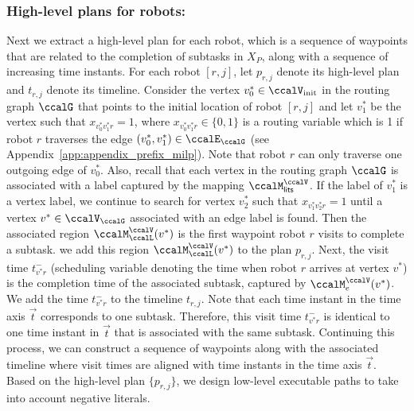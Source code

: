 \documentclass[Afour,sageh,times]{sagej}
\begin{document}
{{\subsubsection{High-level plans for robots:} Next we extract a high-level plan for each robot, which is a sequence of waypoints that are related  to  the completion of subtasks in $X_P$, along with a sequence of increasing time instants. For each robot $[r,j]$, let $p_{r,j}$ denote its high-level plan and $t_{r,j}$ denote its  timeline. Consider the vertex $v^*_0 \in \ccalV_{\text{init}}$ in the routing graph $\ccalG$ that points to the initial location of  robot $[r,j]$  and let $v^*_1$ be the vertex such that $x_{v^*_0 v^*_1 r} =1$, where $x_{v^*_0 v^*_1 r} \in \{0,1\}$ is a routing variable which is 1 if robot $r$ traverses the edge $(v^*_0, v_1^*) \in \ccalE_\ccalG$ (see Appendix~\ref{app:appendix_prefix_milp}). Note that robot $r$ can only traverse one outgoing edge of $v_0^*$. Also,  recall that each vertex in the routing graph $\ccalG$ is associated with a label captured by the mapping $\ccalM_{\mathsf{lits}}^{\ccalV}$. If the label of $v_1^*$ is a vertex label, we continue to search for vertex $v_2^*$ such that $x_{v_1^* v_2^* r}=1$ until a vertex $v^* \in \ccalV_\ccalG$ associated with an edge label is found. Then the associated region  $\ccalM^\ccalV_{\ccalL}(v^*)$ is the first waypoint robot $r$ visits to complete a subtask. we add this region $\ccalM^\ccalV_{\ccalL}(v^*)$ to the plan $p_{r,j}$. Next, the visit time  $t^-_{v^* r}$ (scheduling variable denoting the time  when robot $r$ arrives at vertex $v^*$) is the completion time of the associated subtask, captured by $\ccalM_{e}^{\ccalV}(v^*)$. We add the time $t^-_{v^* r}$ to the timeline $t_{r,j}$. Note that each time instant in the time axis $\vec{t}$ corresponds to one subtask. Therefore, this visit time $t^-_{v^* r}$ is identical to one time instant in $\vec{t}$ that is associated with the same subtask.   Continuing this process, we can construct a sequence of waypoints along with the associated timeline where visit times are aligned with time instants in the time axis $\vec{t}$. Based on the high-level plan $\{p_{r,j}\}$, we design low-level executable paths to take into account negative literals.

}}
\end{document}
